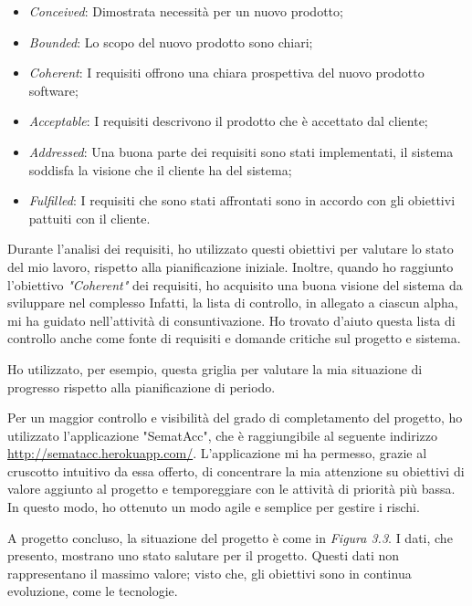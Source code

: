 \begin{itemize}
	\item \textit{Conceived}: Dimostrata necessità per un nuovo prodotto;
	\item \textit{Bounded}: Lo scopo del nuovo prodotto sono chiari;
	\item \textit{Coherent}: I requisiti offrono una chiara prospettiva del nuovo prodotto software;
	\item \textit{Acceptable}: I requisiti descrivono il prodotto che è accettato dal cliente;
	\item \textit{Addressed}: Una buona parte dei requisiti sono stati implementati, il sistema 
	      soddisfa la visione che il cliente ha del sistema;
	\item \textit{Fulfilled}: I requisiti che sono stati affrontati sono in accordo con gli 
	      obiettivi pattuiti con il cliente.
\end{itemize} 

Durante l'analisi dei requisiti, ho utilizzato questi obiettivi per valutare
lo stato del mio lavoro, rispetto alla pianificazione iniziale. 
Inoltre, quando ho raggiunto l'obiettivo \textit{"Coherent"} dei requisiti,
ho acquisito una buona visione del sistema da sviluppare nel complesso    
Infatti, la lista di controllo, in allegato a ciascun alpha, mi ha guidato  
nell'attività di consuntivazione. Ho trovato d'aiuto questa lista 
di controllo anche come fonte di requisiti e domande critiche
sul progetto e sistema.   

Ho utilizzato, per esempio, questa griglia per valutare la mia situazione
di progresso rispetto alla pianificazione di periodo. 


Per un maggior controllo e visibilità del grado di 
completamento del progetto, ho utilizzato l'applicazione "SematAcc", 
che è raggiungibile al seguente indirizzo 
\url{http://sematacc.herokuapp.com/}. 
L'applicazione mi ha permesso, grazie al cruscotto intuitivo 
da essa offerto, di concentrare la mia attenzione su obiettivi di valore 
aggiunto al progetto e temporeggiare con le attività di priorità
più bassa. In questo modo, ho ottenuto un modo agile e semplice 
per gestire i rischi.

A progetto concluso, la situazione del progetto è come in
\textit{Figura 3.3}. I dati, che presento, mostrano uno stato 
salutare per il progetto. Questi dati non rappresentano il massimo
valore; visto che, gli obiettivi sono in continua evoluzione, come 
le tecnologie. 

